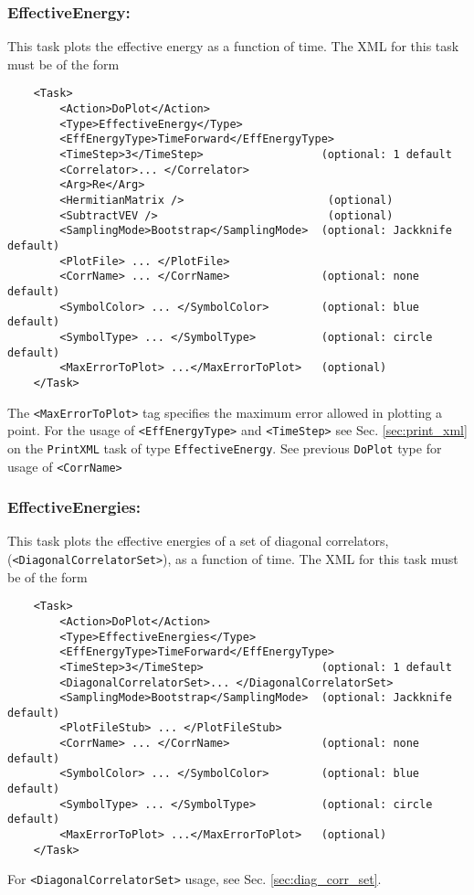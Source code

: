 \documentclass[12pt]{article}
\newcommand{\vb}{\texttt}
\begin{document}
\subsubsection{EffectiveEnergy:}
This task plots the effective energy as a function of time. The XML for this task must be of the form
\begin{verbatim}
    <Task>
        <Action>DoPlot</Action>
        <Type>EffectiveEnergy</Type>
        <EffEnergyType>TimeForward</EffEnergyType>
        <TimeStep>3</TimeStep>                  (optional: 1 default
        <Correlator>... </Correlator>
        <Arg>Re</Arg>
        <HermitianMatrix />                      (optional)
        <SubtractVEV />                          (optional)
        <SamplingMode>Bootstrap</SamplingMode>  (optional: Jackknife default)
        <PlotFile> ... </PlotFile>
        <CorrName> ... </CorrName>              (optional: none default)
        <SymbolColor> ... </SymbolColor>        (optional: blue default)
        <SymbolType> ... </SymbolType>          (optional: circle default)
        <MaxErrorToPlot> ...</MaxErrorToPlot>   (optional)
    </Task> 
\end{verbatim}
The \vb{<MaxErrorToPlot>} tag specifies the maximum error allowed in plotting a point.
For the usage of \vb{<EffEnergyType>} and \vb{<TimeStep>} see Sec. \ref{sec:print_xml}
on the \vb{PrintXML} task of type \vb{EffectiveEnergy}.
See previous \vb{DoPlot} type for usage of \vb{<CorrName>}

\subsubsection{EffectiveEnergies:}
This task plots the effective energies of a set of diagonal correlators, (\vb{<DiagonalCorrelatorSet>}), as a function of time. The XML for this task must be of the form
\begin{verbatim}
    <Task>
        <Action>DoPlot</Action>
        <Type>EffectiveEnergies</Type>
        <EffEnergyType>TimeForward</EffEnergyType>
        <TimeStep>3</TimeStep>                  (optional: 1 default
        <DiagonalCorrelatorSet>... </DiagonalCorrelatorSet>
        <SamplingMode>Bootstrap</SamplingMode>  (optional: Jackknife default)
        <PlotFileStub> ... </PlotFileStub>
        <CorrName> ... </CorrName>              (optional: none default)
        <SymbolColor> ... </SymbolColor>        (optional: blue default)
        <SymbolType> ... </SymbolType>          (optional: circle default)
        <MaxErrorToPlot> ...</MaxErrorToPlot>   (optional)
    </Task> 
\end{verbatim}
For \vb{<DiagonalCorrelatorSet>} usage, see Sec. \ref{sec:diag_corr_set}.
\end{document}
